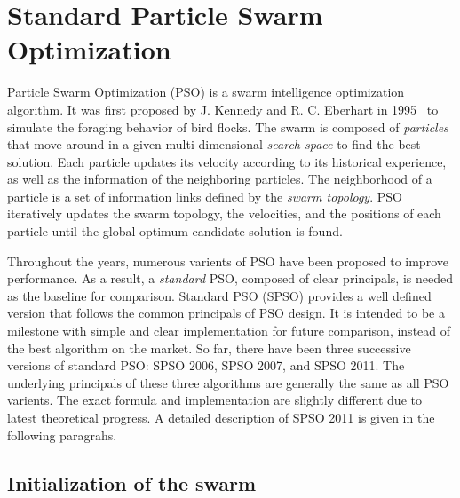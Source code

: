 \section{Standard Particle Swarm Optimization}

Particle Swarm Optimization (PSO) is a swarm intelligence optimization algorithm. 
It was first proposed by J. Kennedy and R. C. Eberhart in 1995~\cite{Kennedy:1995:PSO} to simulate the foraging behavior of bird flocks.
The swarm is composed of \textit{particles} that move around in a given multi-dimensional \textit{search space} to find the best solution.
Each particle updates its velocity according to its historical experience, as well as the information of the neighboring particles.
The neighborhood of a particle is a set of information links defined by the \textit{swarm topology}.%
PSO iteratively updates the swarm topology, the velocities, and the positions of each particle until the global optimum candidate solution is found.


Throughout the years, numerous varients of PSO have been proposed to improve performance.
As a result, a \textit{standard} PSO, composed of clear principals, is needed as the baseline for comparison.
Standard PSO (SPSO) provides a well defined version that follows the common principals of PSO design.
It is intended to be a milestone with simple and clear implementation for future comparison, instead of the best algorithm on the market.
So far, there have been three successive versions of standard PSO: SPSO 2006, SPSO 2007, and SPSO 2011.
The underlying principals of these three algorithms are generally the same as all PSO varients.
The exact formula and implementation are slightly different due to latest theoretical progress.
A detailed description of SPSO 2011 is given in the following paragrahs.

\subsection{Initialization of the swarm}

